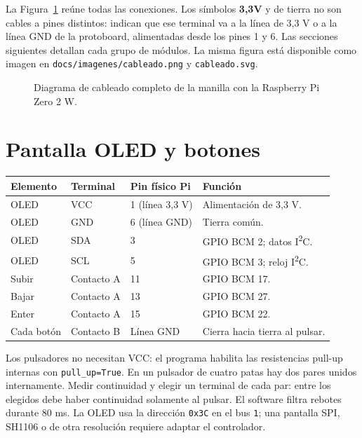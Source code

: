 \documentclass[11pt,a4paper]{article}
\newcommand{\iic}{I\textsuperscript{2}C}
\begin{document}
La Figura~\ref{fig:cableado} reúne todas las conexiones. Los símbolos
\textbf{3,3V} y de tierra no son cables a pines distintos: indican que ese
terminal va a la línea de 3,3 V o a la línea GND de la protoboard, alimentadas
desde los pines 1 y 6. Las secciones siguientes detallan cada grupo de módulos.
La misma figura está disponible como imagen en
\texttt{docs/imagenes/cableado.png} y \texttt{cableado.svg}.

\begin{figure}[p]
\centering
\resizebox{\linewidth}{!}{}
\caption{Diagrama de cableado completo de la manilla con la Raspberry Pi Zero 2 W.}
\label{fig:cableado}
\end{figure}

\section{Pantalla OLED y botones}

\begin{center}
\begin{tabularx}{\linewidth}{lllX}
\toprule
\textbf{Elemento} & \textbf{Terminal} & \textbf{Pin físico Pi} & \textbf{Función}\\
\midrule
OLED & VCC & 1 (línea 3,3 V) & Alimentación de 3,3 V.\\
OLED & GND & 6 (línea GND) & Tierra común.\\
OLED & SDA & 3 & GPIO BCM 2; datos \iic.\\
OLED & SCL & 5 & GPIO BCM 3; reloj \iic.\\
Subir & Contacto A & 11 & GPIO BCM 17.\\
Bajar & Contacto A & 13 & GPIO BCM 27.\\
Enter & Contacto A & 15 & GPIO BCM 22.\\
Cada botón & Contacto B & Línea GND & Cierra hacia tierra al pulsar.\\
\bottomrule
\end{tabularx}
\end{center}

Los pulsadores no necesitan VCC: el programa habilita las resistencias pull-up
internas con \texttt{pull\_up=True}.\cite{gpiozero} En un pulsador de cuatro
patas hay dos pares unidos internamente. Medir continuidad y elegir un terminal
de cada par: entre los elegidos debe haber continuidad solamente al pulsar. El
software filtra rebotes durante 80 ms. La OLED usa la dirección \texttt{0x3C} en
el bus \texttt{1}; una pantalla SPI, SH1106 o de otra resolución requiere
adaptar el controlador.\cite{luma}
\end{document}
